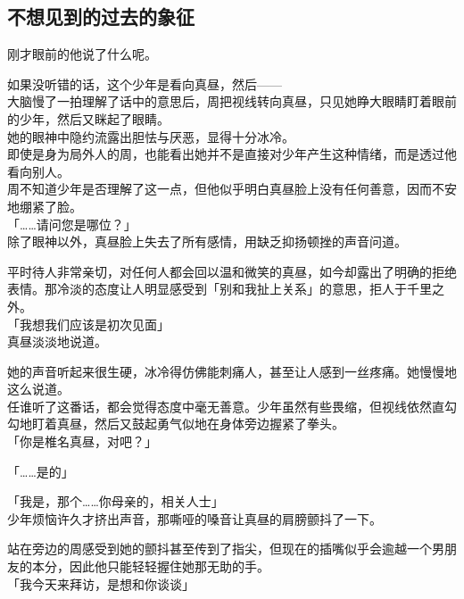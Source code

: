 \subsection{不想见到的过去的象征}

刚才眼前的他说了什么呢。

如果没听错的话，这个少年是看向真昼，然后——\\

大脑慢了一拍理解了话中的意思后，周把视线转向真昼，只见她睁大眼睛盯着眼前的少年，然后又眯起了眼睛。\\

她的眼神中隐约流露出胆怯与厌恶，显得十分冰冷。\\

即使是身为局外人的周，也能看出她并不是直接对少年产生这种情绪，而是透过他看向别人。\\

周不知道少年是否理解了这一点，但他似乎明白真昼脸上没有任何善意，因而不安地绷紧了脸。\\

「……请问您是哪位？」\\

除了眼神以外，真昼脸上失去了所有感情，用缺乏抑扬顿挫的声音问道。

平时待人非常亲切，对任何人都会回以温和微笑的真昼，如今却露出了明确的拒绝表情。那冷淡的态度让人明显感受到「别和我扯上关系」的意思，拒人于千里之外。\\

「我想我们应该是初次见面」\\

真昼淡淡地说道。

她的声音听起来很生硬，冰冷得仿佛能刺痛人，甚至让人感到一丝疼痛。她慢慢地这么说道。\\

任谁听了这番话，都会觉得态度中毫无善意。少年虽然有些畏缩，但视线依然直勾勾地盯着真昼，然后又鼓起勇气似地在身体旁边握紧了拳头。\\

「你是椎名真昼，对吧？」

「……是的」

「我是，那个……你母亲的，相关人士」\\

少年烦恼许久才挤出声音，那嘶哑的嗓音让真昼的肩膀颤抖了一下。

站在旁边的周感受到她的颤抖甚至传到了指尖，但现在的插嘴似乎会逾越一个男朋友的本分，因此他只能轻轻握住她那无助的手。\\

「我今天来拜访，是想和你谈谈」

